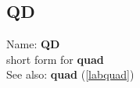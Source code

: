 \subsection{QD}
\label{labqd}
\noindent Name: \textbf{QD}\\
\phantom{aaa}short form for \textbf{quad}\\[0.2cm]
See also: \textbf{quad} (\ref{labquad})
